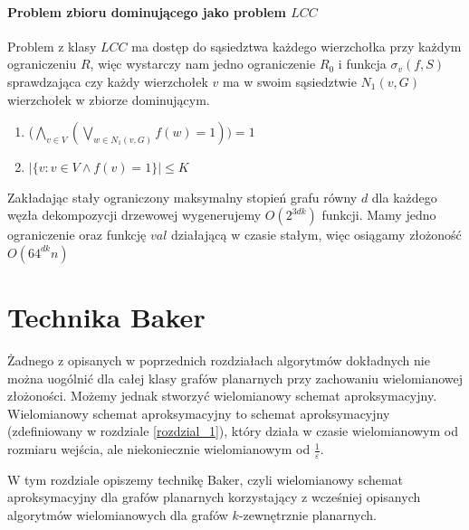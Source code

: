 \documentclass[twoside,a4paper,12pt]{report} %
\theoremstyle{break}
\begin{document}
\subsubsection{Problem zbioru dominującego jako problem $LCC$}
Problem z klasy $LCC$ ma dostęp do sąsiedztwa każdego wierzchołka przy każdym ograniczeniu $R$, więc wystarczy nam jedno ograniczenie $R_0$ i funkcja $\sigma_v(f,S)$ sprawdzająca czy każdy wierzchołek $v$ ma w swoim sąsiedztwie $N_1(v,G)$ wierzchołek w zbiorze dominującym.
\begin{enumerate}
    \item ($\bigwedge_{v \in V} (\bigvee_{w \in N_1(v,G)} f(w) = 1)) = 1$
    \item $|\{v \colon v \in V \land f(v)=1\}| \le K$
\end{enumerate}

Zakładając stały ograniczony maksymalny stopień grafu równy $d$ dla każdego węzła dekompozycji drzewowej wygenerujemy $O(2^{3dk})$ funkcji. Mamy jedno ograniczenie oraz funkcję $val$ działającą w czasie stałym, więc osiągamy złożoność $O(64^{dk}n)$ 



\chapter{Technika Baker} \label{rozdzial_6}
Żadnego z opisanych w poprzednich rozdziałach algorytmów dokładnych nie można uogólnić dla całej klasy grafów planarnych przy zachowaniu wielomianowej złożoności. Możemy jednak stworzyć wielomianowy schemat aproksymacyjny. Wielomianowy schemat aproksymacyjny to schemat aproksymacyjny (zdefiniowany w rozdziale \ref{rozdzial_1}), który działa w czasie wielomianowym od rozmiaru wejścia, ale niekoniecznie wielomianowym od $\frac{1}{\varepsilon}$.

W tym rozdziale opiszemy technikę Baker, czyli wielomianowy schemat aproksymacyjny dla grafów planarnych korzystający z wcześniej opisanych algorytmów wielomianowych dla grafów $k$-zewnętrznie planarnych.
\end{document}
